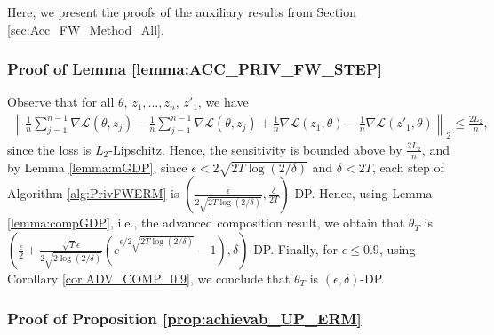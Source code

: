 \documentclass{article}
\begin{document}
Here, we present the proofs of the auxiliary results from Section \ref{sec:Acc_FW_Method_All}.


\subsubsection{Proof of Lemma \ref{lemma:ACC_PRIV_FW_STEP}}
\label{AppLemACC}

Observe that for all $\theta$, $z_1, \dots, z_n$, $z'_1$, we have
\begin{align*}
\left\|\frac{1}{n}\sum_{j = 1}^{n - 1}\nabla \mathcal{L}(\theta, z_j) - \frac{1}{n}\sum_{j = 1}^{n - 1}\nabla \mathcal{L}(\theta, z_j) + \frac{1}{n}\nabla \mathcal{L}(z_1, \theta) - \frac{1}{n}\nabla \mathcal{L}(z'_1, \theta)\right\|_2 \leq \frac{2L_2}{n},
\end{align*}
since the loss is $L_2$-Lipschitz. Hence, the sensitivity is bounded above by $\frac{2L_2}{n}$, and by Lemma \ref{lemma:mGDP}, since $\epsilon < 2\sqrt{2T\log(2/\delta)}$ and $\delta < 2T$, each step of Algorithm \ref{alg:PrivFWERM} is $\left(\frac{\epsilon}{2\sqrt{2T\log(2/\delta)}}, \frac{\delta}{2T}\right)$-DP. Hence, using Lemma \ref{lemma:compGDP}, i.e., the advanced composition result, we obtain that $\theta_T$ is $\left(\frac{\epsilon}{2} + \frac{\sqrt{T}\epsilon}{2\sqrt{2\log(2/\delta)}}(e^{\epsilon/2\sqrt{2T\log(2/\delta)}} - 1), \delta\right)$-DP. Finally, for $\epsilon \leq 0.9$, using Corollary \ref{cor:ADV_COMP_0.9}, we conclude that $\theta_T$ is $(\epsilon, \delta)$-DP. 


\subsubsection{Proof of Proposition \ref{prop:achievab_UP_ERM}}
\label{AppPropERM}
\end{document}
